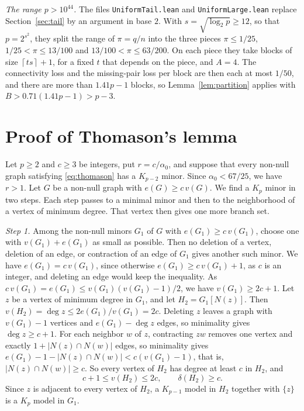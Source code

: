 \documentclass[11pt]{article}
\newcommand{\ceil}[1]{\left\lceil#1\right\rceil}
\begin{document}
\emph{The range $p>10^{44}$.} The files \texttt{UniformTail.lean} and
\texttt{UniformLarge.lean} replace Section~\ref{sec:tail} by an argument in
base $2$. With $s=\sqrt{\log_2p}\ge12$, so that $p=2^{s^2}$, they split the
range of $\pi=q/n$ into the three pieces $\pi\le1/25$,
$1/25<\pi\le13/100$ and $13/100<\pi\le63/200$. On each piece they take
blocks of size $\ceil{ts}+1$, for a fixed $t$ that depends on the piece, and
$A=4$. The connectivity loss and the missing-pair loss per block are then
each at most $1/50$, and there are more than $1.41p-1$ blocks, so
Lemma~\ref{lem:partition} applies with
$B>0.71(1.41p-1)>p-3$.

\appendix
\section{Proof of Thomason's lemma}\label{app:reduction}

Let $p\ge2$ and $c\ge3$ be integers, put $r=c/\alpha_0$, and suppose that
every non-null graph satisfying \eqref{eq:thomason} has a $K_{p-2}$ minor.
Since $\alpha_0<67/25$, we have $r>1$. Let $G$ be a non-null graph with
$e(G)\ge c\,v(G)$. We find a $K_p$ minor in two steps. Each step passes to a
minimal minor and then to the neighborhood of a vertex of minimum degree.
That vertex then gives one more branch set.

\emph{Step 1.} Among the non-null minors $G_1$ of $G$ with
$e(G_1)\ge c\,v(G_1)$, choose one with $v(G_1)+e(G_1)$ as small as possible.
Then no deletion of a vertex, deletion of an edge, or contraction of an edge of
$G_1$ gives another such minor. We have $e(G_1)=c\,v(G_1)$, since otherwise
$e(G_1)\ge c\,v(G_1)+1$, as $c$ is an integer, and deleting an edge would keep
the inequality. As $c\,v(G_1)=e(G_1)\le v(G_1)(v(G_1)-1)/2$, we have
$v(G_1)\ge2c+1$. Let $z$ be a vertex of minimum degree in $G_1$, and let
$H_2=G_1[N(z)]$. Then $v(H_2)=\deg z\le2e(G_1)/v(G_1)=2c$. Deleting $z$ leaves
a graph with $v(G_1)-1$ vertices and $e(G_1)-\deg z$ edges, so minimality
gives $\deg z\ge c+1$. For each neighbor $w$ of $z$, contracting $zw$ removes
one vertex and exactly $1+|N(z)\cap N(w)|$ edges, so minimality gives
$e(G_1)-1-|N(z)\cap N(w)|<c(v(G_1)-1)$, that is, $|N(z)\cap N(w)|\ge c$. So
every vertex of $H_2$ has degree at least $c$ in $H_2$, and
\begin{equation*}
 c+1\le v(H_2)\le2c,\qquad \delta(H_2)\ge c.
\end{equation*}
Since $z$ is adjacent to every vertex of $H_2$, a $K_{p-1}$ model in $H_2$
together with $\{z\}$ is a $K_p$ model in $G_1$.
\end{document}
